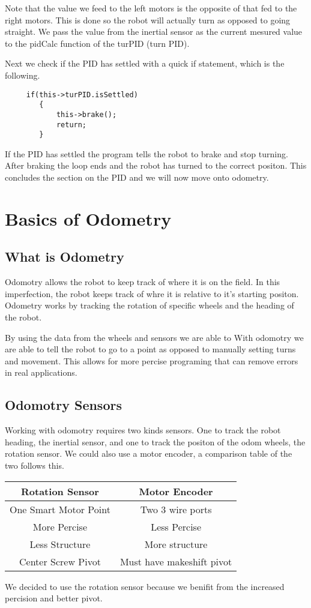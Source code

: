 \documentclass[12pt]{article}
\begin{document}
    Note that the value we feed to the left motors is the opposite of that fed to the right motors. This is done so the robot will actually turn as opposed to going straight. We pass the value from the inertial sensor as the current mesured value to the pidCalc function of the turPID (turn PID).

    Next we check if the PID has settled with a quick if statement, which is the following.
    \begin{verbatim}
     if(this->turPID.isSettled)
        {
            this->brake();
            return;
        }
    \end{verbatim}

    If the PID has settled the program tells the robot to brake and stop turning. After braking the loop ends and the robot has turned to the correct positon. This concludes the section on the PID and we will now move onto odometry.


\pagebreak
\section{Basics of Odometry}
\subsection{What is Odometry}
    Odomotry allows the robot to keep track of where it is on the field. In this imperfection, the robot keeps track of whre it is relative to it's starting positon. Odometry works by tracking the rotation of specific wheels and the heading of the robot.

    By using the data from the wheels and sensors we are able to
    With odomotry we are able to tell the robot to go to a point as opposed to manually setting turns and movement. This allows for more percise programing that can remove errors in real applications.

\subsection{Odomotry Sensors}
    Working with odomotry requires two kinds sensors. One to track the robot heading, the inertial sensor, and one to track the positon of the odom wheels, the rotation sensor. We could also use a motor encoder, a comparison table of the two follows this.
    \begin{center}
        \begin{tabular}{c|c}
            Rotation Sensor & Motor Encoder \\
            \hline
            One Smart Motor Point & Two 3 wire ports \\
            More Percise & Less Percise \\
            Less Structure & More structure \\
            Center Screw Pivot & Must have makeshift pivot \\
        \end{tabular}

        We decided to use the rotation sensor because we benifit from the increased percision and better pivot.
    \end{center}
\end{document}
